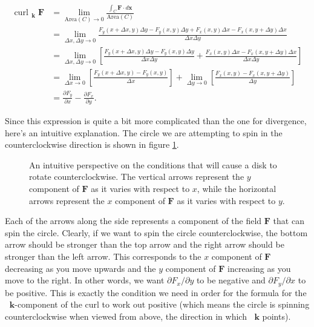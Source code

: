 \documentclass{myarticle}
\DeclareMathOperator{\curls}{curl}
\renewcommand{\vec}[1]{\mathbf{#1}}
\newcommand{\unitvector}[1]{
  \mathop{}\!\vec{#1}
}
\newcommand{\kh}{\unitvector{k}}
\theoremstyle{nospace}
\newtheorem{old series theorem}{Theorem}
\newenvironment{series theorem}{\begin{mdframed}\begin{old series theorem}}{\end{old series theorem}\end{mdframed}}
\begin{document}
\begin{align*}
\curls_{\kh} \vec{F} &= \lim_{\text{Area}(C) \to 0} \frac{\int_C \vec{F} \cdot d\vec{x}}{\text{Area}(C)} \\
&= \lim_{\Delta x, \Delta y \to 0} \frac{F_y(x + \Delta x, y)\Delta y - F_y(x, y)\Delta y + F_x(x, y)\Delta x - F_x(x, y + \Delta y)\Delta x}{\Delta x \Delta y} \\
&= \lim_{\Delta x, \Delta y \to 0} \left[\frac{F_y(x + \Delta x, y)\Delta y - F_y(x, y)\Delta y}{\Delta x \Delta y} + \frac{F_x(x, y)\Delta x - F_x(x, y + \Delta y)\Delta x}{\Delta x \Delta y}\right] \\
&= \lim_{\Delta x \to 0} \left[\frac{F_y(x + \Delta x, y) - F_y(x, y)}{\Delta x}\right] + \lim_{\Delta y \to 0} \left[\frac{F_x(x, y) - F_x(x, y + \Delta y)}{\Delta y}\right] \\
&= \frac{\partial F_y}{\partial x} - \frac{\partial F_x}{\partial y}.
\end{align*}

Since this expression is quite a bit more complicated than the one for divergence, here's an intuitive explanation. The circle we are attempting to spin in the counterclockwise direction is shown in figure \ref{fig:circle spin}.

\begin{figure}[htb!] \centering
{}
\caption{An intuitive perspective on the conditions that will cause a disk to rotate counterclockwise. The vertical arrows represent the $y$ component of $\vec{F}$ as it varies with respect to $x$, while the horizontal arrows represent the $x$ component of $\vec{F}$ as it varies with respect to $y$.}
\label{fig:circle spin}
\end{figure}

Each of the arrows along the side represents a component of the field $\vec{F}$ that can spin the circle. Clearly, if we want to spin the circle counterclockwise, the bottom arrow should be stronger than the top arrow and the right arrow should be stronger than the left arrow. This corresponds to the $x$ component of $\vec{F}$ decreasing as you move upwards and the $y$ component of $\vec{F}$ increasing as you move to the right. In other words, we want $\partial F_x/\partial y$ to be negative and $\partial F_y/\partial x$ to be positive. This is exactly the condition we need in order for the formula for the $\kh$-component of the curl to work out positive (which means the circle is spinning counterclockwise when viewed from above, the direction in which $\kh$ points).
\end{document}
